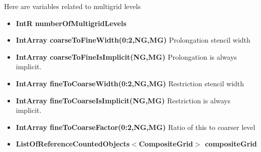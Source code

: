 Here are variables related to multigrid levels
\begin{itemize}
\item {\bf IntR numberOfMultigridLevels} 
\item {\bf IntArray coarseToFineWidth(0:2,NG,MG)}  Prolongation stencil width
\item {\bf IntArray coarseToFineIsImplicit(NG,MG)} Prolongation is always implicit.
\item {\bf IntArray fineToCoarseWidth(0:2,NG,MG)}  Restriction stencil width
\item {\bf IntArray fineToCoarseIsImplicit(NG,MG)} Restriction is always implicit.
\item {\bf IntArray fineToCoarseFactor(0:2,NG,MG)}  Ratio of this to coarser level
\item {\bf ListOfReferenceCountedObjects$<$CompositeGrid$>$ compositeGrid}
\end{itemize}
